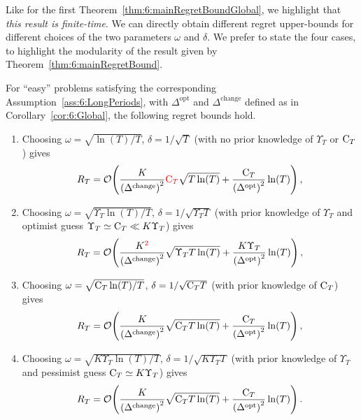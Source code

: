 Like for the first Theorem~\ref{thm:6:mainRegretBoundGlobal},
we highlight that \emph{this result is finite-time}.
%
We can directly obtain different regret upper-bounds for different choices of the two parameters $\omega$ and $\delta$.
We prefer to state the four cases, to highlight the modularity of the result given by Theorem~\ref{thm:6:mainRegretBound}.

\begin{corollary}\label{cor:6:Local}
\begin{leftbar}[corollarybar]  %
    For ``easy'' problems satisfying the corresponding Assumption~\ref{ass:6:LongPeriods},
    with $\Delta^{\text{opt}}$ and ${\Delta}^{\text{change}}$ defined as in Corollary~\ref{cor:6:Global}, the following regret bounds hold.
    \begin{enumerate}
        \item Choosing $\omega = \sqrt{\ln(T) / T}$, $\delta = 1 / \sqrt{T}$ (with no prior knowledge of $\Upsilon_T$ or $\mathrm{C}_T$) gives
        \begin{equation}
            R_T = \mathop{}\mathopen{}\mathcal{O}\mathopen{}\left(\frac{K}{\left(\Delta^{\text{change}}\right)^2} \textcolor{red}{\mathrm{C}_T}\sqrt{T\ln(T)} + \frac{\mathrm{C}_T}{\left(\Delta^{\text{opt}}\right)^2} \ln(T)\right),
        \end{equation}
        \item Choosing $\omega = \sqrt{\Upsilon_T\ln(T) / T}$, $\delta = 1 / \sqrt{\Upsilon_T T}$ (with prior knowledge of $\Upsilon_T$ and optimist guess $\Upsilon_T \simeq \mathrm{C}_T \ll K \Upsilon_T$) gives
        \begin{equation}
            R_T = \mathop{}\mathopen{}\mathcal{O}\mathopen{}\left(\frac{K^{\textcolor{red}{2}}}{\left({\Delta}^{\text{change}}\right)^2}\sqrt{\Upsilon_T T\ln(T)} + \frac{K\Upsilon_T}{\left(\Delta^{\text{opt}}\right)^2}\ln(T)\right),
        \end{equation}
        \item Choosing $\omega = \sqrt{\mathrm{C}_T\ln(T) / T}$, $\delta = 1 / \sqrt{\mathrm{C}_T T}$ (with prior knowledge of $\mathrm{C}_T$) gives
        \begin{equation}
            R_T = \mathop{}\mathopen{}\mathcal{O}\mathopen{}\left(\frac{K}{\left({\Delta}^{\text{change}}\right)^2}\sqrt{\mathrm{C}_T T\ln(T)} + \frac{\mathrm{C}_T}{\left(\Delta^{\text{opt}}\right)^2}\ln(T)\right),
        \end{equation}
        \item Choosing $\omega = \sqrt{K\Upsilon_T\ln(T) / T}$, $\delta = 1 / \sqrt{K\Upsilon_T T}$ (with prior knowledge of $\Upsilon_T$ and pessimist guess $\mathrm{C}_T \simeq K \Upsilon_T$) gives
        \begin{equation}
            R_T = \mathop{}\mathopen{}\mathcal{O}\mathopen{}\left(\frac{K}{\left({\Delta}^{\text{change}}\right)^2}\sqrt{\mathrm{C}_T T\ln(T)} + \frac{\mathrm{C}_T}{\left(\Delta^{\text{opt}}\right)^2} \ln(T)\right).
        \end{equation}
    \end{enumerate}
\end{leftbar}  %
\end{corollary}

